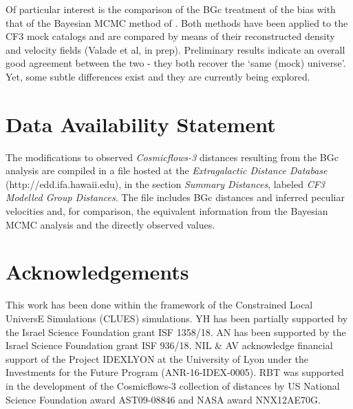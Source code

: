 \documentclass[useAMS,usenatbib]{mn2e}
\begin{document}
Of particular interest is the comparison of the BGc treatment of the bias with that of the Bayesian MCMC method of \cite{2019MNRAS.488.5438G}. Both methods have  been applied to the CF3 mock catalogs and are compared by means of their reconstructed density and velocity fields (Valade et al,  in prep). Preliminary results indicate  an overall good agreement between the two - they both recover the `same (mock) universe'. Yet, some subtle differences exist and they are currently   being  explored. 

\section*{Data Availability Statement}
The modifications to observed {\it Cosmicflows-3} distances resulting from the BGc analysis are compiled in a file hosted at the {\it Extragalactic Distance Database} (http://edd.ifa.hawaii.edu), in the section {\it Summary Distances}, labeled {\it CF3 Modelled Group Distances}.  The file includes BGc distances and inferred peculiar velocities and, for comparison, the equivalent information from the \cite{2019MNRAS.488.5438G} Bayesian MCMC analysis and the directly observed values.
\section*{Acknowledgements}
This work has been done within the framework of the Constrained Local UniversE Simulations (CLUES) simulations.
YH has been partially supported by the Israel Science Foundation grant ISF 1358/18.
AN has been supported by the Israel Science Foundation grant 
ISF 936/18.
NIL \& AV  acknowledge financial support of the Project IDEXLYON at the University of Lyon under the Investments for the Future Program (ANR-16-IDEX-0005). RBT was supported in the development of the Cosmicflows-3 collection of distances by US National Science Foundation award AST09-08846 and NASA award NNX12AE70G.

 




\bsp
\label{lastpage}
\end{document}
